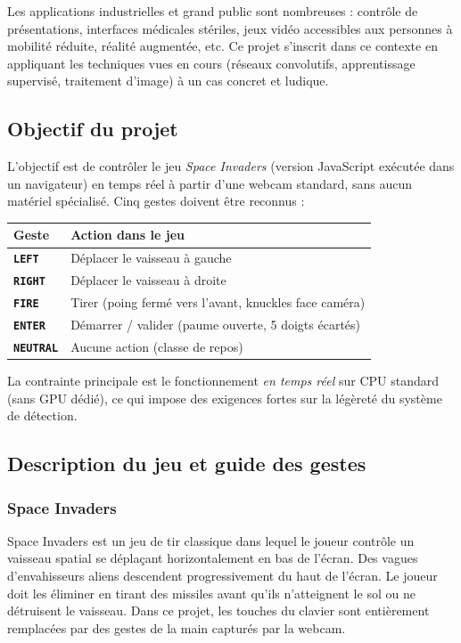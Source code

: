 \documentclass[12pt, a4paper]{article}
\newcommand{\cls}[1]{\textbf{\texttt{#1}}}
\begin{document}
Les applications industrielles et grand public sont nombreuses : contrôle de
présentations, interfaces médicales stériles, jeux vidéo accessibles aux
personnes à mobilité réduite, réalité augmentée, etc. Ce projet s'inscrit dans
ce contexte en appliquant les techniques vues en cours (réseaux convolutifs,
apprentissage supervisé, traitement d'image) à un cas concret et ludique.

\subsection{Objectif du projet}

L'objectif est de contrôler le jeu \emph{Space Invaders} (version JavaScript
exécutée dans un navigateur) en temps réel à partir d'une webcam standard,
sans aucun matériel spécialisé. Cinq gestes doivent être reconnus :

\begin{center}
\begin{tabular}{@{}ll@{}}
  \toprule
  \textbf{Geste} & \textbf{Action dans le jeu} \\
  \midrule
  \cls{LEFT}    & Déplacer le vaisseau à gauche \\
  \cls{RIGHT}   & Déplacer le vaisseau à droite \\
  \cls{FIRE}    & Tirer (poing fermé vers l'avant, knuckles face caméra) \\
  \cls{ENTER}   & Démarrer / valider (paume ouverte, 5 doigts écartés) \\
  \cls{NEUTRAL} & Aucune action (classe de repos) \\
  \bottomrule
\end{tabular}
\end{center}

La contrainte principale est le fonctionnement \emph{en temps réel} sur CPU
standard (sans GPU dédié), ce qui impose des exigences fortes sur la légèreté
du système de détection.

\subsection{Description du jeu et guide des gestes}

\subsubsection{Space Invaders}

Space Invaders est un jeu de tir classique dans lequel le joueur contrôle un
vaisseau spatial se déplaçant horizontalement en bas de l'écran. Des vagues
d'envahisseurs aliens descendent progressivement du haut de l'écran. Le joueur
doit les éliminer en tirant des missiles avant qu'ils n'atteignent le sol ou
ne détruisent le vaisseau. Dans ce projet, les touches du clavier sont
entièrement remplacées par des gestes de la main capturés par la webcam.
\end{document}
